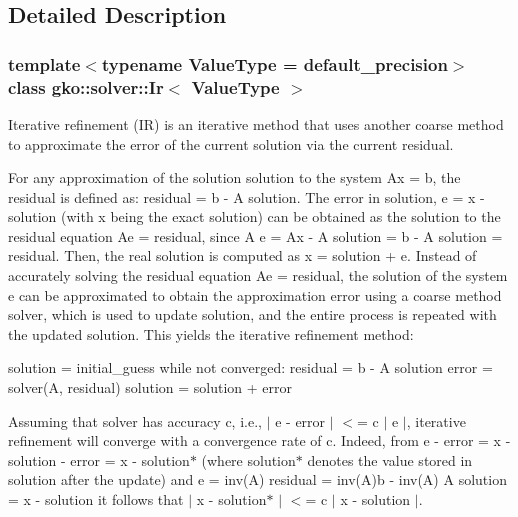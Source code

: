 \subsection{Detailed Description}
\subsubsection*{template$<$typename Value\+Type = default\+\_\+precision$>$\newline
class gko\+::solver\+::\+Ir$<$ Value\+Type $>$}

Iterative refinement (IR) is an iterative method that uses another coarse method to approximate the error of the current solution via the current residual. 

For any approximation of the solution {\ttfamily solution} to the system {\ttfamily Ax = b}, the residual is defined as\+: {\ttfamily residual = b -\/ A solution}. The error in {\ttfamily solution}, {\ttfamily e = x -\/ solution} (with {\ttfamily x} being the exact solution) can be obtained as the solution to the residual equation {\ttfamily Ae = residual}, since {\ttfamily A e = Ax -\/ A solution = b -\/ A solution = residual}. Then, the real solution is computed as {\ttfamily x = solution + e}. Instead of accurately solving the residual equation {\ttfamily Ae = residual}, the solution of the system {\ttfamily e} can be approximated to obtain the approximation {\ttfamily error} using a coarse method {\ttfamily solver}, which is used to update {\ttfamily solution}, and the entire process is repeated with the updated {\ttfamily solution}. This yields the iterative refinement method\+:


\begin{DoxyCode}
solution = initial\_guess
\textcolor{keywordflow}{while} not converged:
    residual = b - A solution
    error = solver(A, residual)
    solution = solution + error
\end{DoxyCode}


Assuming that {\ttfamily solver} has accuracy {\ttfamily c}, i.\+e., {\ttfamily $\vert$ e -\/ error $\vert$ $<$= c $\vert$ e $\vert$}, iterative refinement will converge with a convergence rate of {\ttfamily c}. Indeed, from {\ttfamily e -\/ error = x -\/ solution -\/ error = x -\/ solution$\ast$} (where {\ttfamily solution$\ast$} denotes the value stored in {\ttfamily solution} after the update) and {\ttfamily e = inv(\+A) residual = inv(\+A)b -\/ inv(\+A) A solution = x -\/ solution} it follows that $\vert$ x -\/ solution$\ast$ $\vert$ $<$= c $\vert$ x -\/ solution $\vert$.

